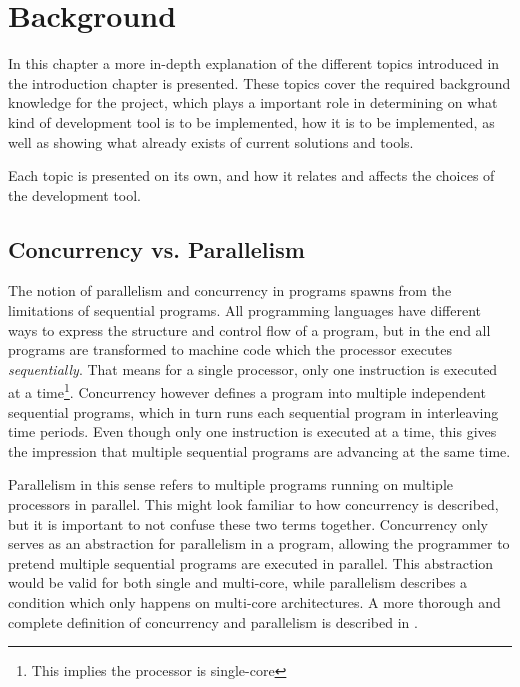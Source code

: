 
\chapter{Background}
\label{ch:background}

In this chapter a more in\hyp{}depth explanation of the different topics introduced in the introduction chapter is presented. These topics cover the required background knowledge for the project, which plays a important role in determining on what kind of development tool is to be implemented, how it is to be implemented, as well as showing what already exists of current solutions and tools.

Each topic is presented on its own, and how it relates and affects the choices of the development tool.


\section{Concurrency vs. Parallelism}
\label{sec:concurrency_vs_parallelism}

The notion of parallelism and concurrency in programs spawns from the limitations of sequential programs. All programming languages have different ways to express the structure and control flow of a program, but in the end all programs are transformed to machine code which the processor executes \textit{sequentially}. That means for a single processor, only one instruction is executed at a time\footnote{This implies the processor is single-core}. Concurrency however defines a program into multiple independent sequential programs, which in turn runs each sequential program in interleaving time periods. Even though only one instruction is executed at a time, this gives the impression that multiple sequential programs are advancing at the same time.

Parallelism in this sense refers to multiple programs running on multiple processors in parallel. This might look familiar to how concurrency is described, but it is important to not confuse these two terms together. Concurrency only serves as an abstraction for parallelism in a program, allowing the programmer to pretend multiple sequential programs are executed in parallel. This abstraction would be valid for both single and multi\hyp{}core, while parallelism describes a condition which only happens on multi\hyp{}core architectures. A more thorough and complete definition of concurrency and parallelism is described in \citet{benari2006}.

